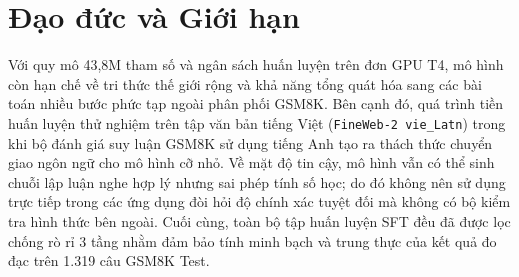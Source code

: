 \section{Đạo đức và Giới hạn}
Với quy mô 43,8M tham số và ngân sách huấn luyện trên đơn GPU T4, mô hình còn hạn chế về tri thức thế giới rộng và khả năng tổng quát hóa sang các bài toán nhiều bước phức tạp ngoài phân phối GSM8K. Bên cạnh đó, quá trình tiền huấn luyện thử nghiệm trên tập văn bản tiếng Việt (\texttt{FineWeb-2 vie\_Latn}) trong khi bộ đánh giá suy luận GSM8K sử dụng tiếng Anh tạo ra thách thức chuyển giao ngôn ngữ cho mô hình cỡ nhỏ. Về mặt độ tin cậy, mô hình vẫn có thể sinh chuỗi lập luận nghe hợp lý nhưng sai phép tính số học; do đó không nên sử dụng trực tiếp trong các ứng dụng đòi hỏi độ chính xác tuyệt đối mà không có bộ kiểm tra hình thức bên ngoài. Cuối cùng, toàn bộ tập huấn luyện SFT đều đã được lọc chống rò rỉ 3 tầng nhằm đảm bảo tính minh bạch và trung thực của kết quả đo đạc trên 1.319 câu GSM8K Test.
